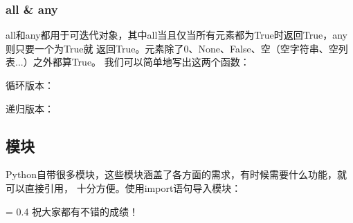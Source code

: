 \documentclass{style/ucasproposal}
\newlength{\drop}
\newcommand*{\backDB}{\begingroup
	\drop = 0.4\textheight
	\centering
	\vspace*{\drop}
	{\LARGE 祝大家都有不错的成绩！}\\[0.1\baselineskip]
	\endgroup}
\begin{document}
\subsubsection{all \& any}
all和any都用于可迭代对象，其中all当且仅当所有元素都为True时返回True，any则只要一个为True就
返回True。元素除了0、None、False、空（空字符串、空列表...）之外都算True。
我们可以简单地写出这两个函数：

\begin{multicols}{2}
	循环版本：
	
	递归版本：
\end{multicols}

\subsection{模块}
Python自带很多模块，这些模块涵盖了各方面的需求，有时候需要什么功能，就可以直接引用，
十分方便。使用import语句导入模块：

\newpage
\thispagestyle{empty}
\backDB
\end{document}
